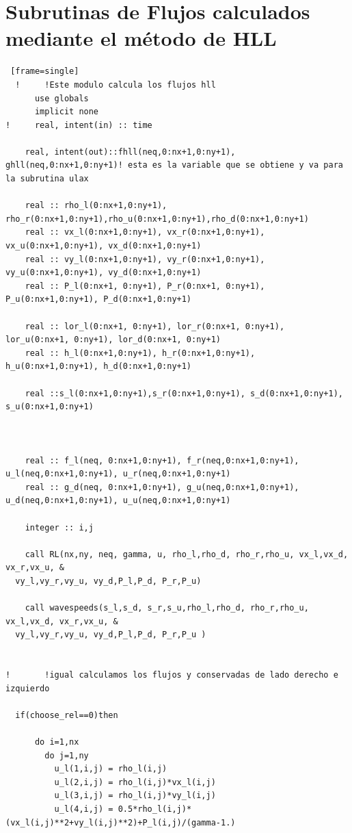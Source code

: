 \documentclass[12pt,a4paper]{book}
\begin{document}
\chapter{Subrutinas de Flujos calculados mediante el método de HLL}\label{ap_subrutina_fluxesHLL}

\begin{lstlisting} [frame=single]
  !     !Este modulo calcula los flujos hll
      use globals
      implicit none
!     real, intent(in) :: time
    
    real, intent(out)::fhll(neq,0:nx+1,0:ny+1), ghll(neq,0:nx+1,0:ny+1)! esta es la variable que se obtiene y va para la subrutina ulax

    real :: rho_l(0:nx+1,0:ny+1), rho_r(0:nx+1,0:ny+1),rho_u(0:nx+1,0:ny+1),rho_d(0:nx+1,0:ny+1)
    real :: vx_l(0:nx+1,0:ny+1), vx_r(0:nx+1,0:ny+1), vx_u(0:nx+1,0:ny+1), vx_d(0:nx+1,0:ny+1)
    real :: vy_l(0:nx+1,0:ny+1), vy_r(0:nx+1,0:ny+1), vy_u(0:nx+1,0:ny+1), vy_d(0:nx+1,0:ny+1)
    real :: P_l(0:nx+1, 0:ny+1), P_r(0:nx+1, 0:ny+1), P_u(0:nx+1,0:ny+1), P_d(0:nx+1,0:ny+1)

    real :: lor_l(0:nx+1, 0:ny+1), lor_r(0:nx+1, 0:ny+1), lor_u(0:nx+1, 0:ny+1), lor_d(0:nx+1, 0:ny+1)
    real :: h_l(0:nx+1,0:ny+1), h_r(0:nx+1,0:ny+1), h_u(0:nx+1,0:ny+1), h_d(0:nx+1,0:ny+1)

    real ::s_l(0:nx+1,0:ny+1),s_r(0:nx+1,0:ny+1), s_d(0:nx+1,0:ny+1), s_u(0:nx+1,0:ny+1)
    
    

    real :: f_l(neq, 0:nx+1,0:ny+1), f_r(neq,0:nx+1,0:ny+1), u_l(neq,0:nx+1,0:ny+1), u_r(neq,0:nx+1,0:ny+1)
    real :: g_d(neq, 0:nx+1,0:ny+1), g_u(neq,0:nx+1,0:ny+1), u_d(neq,0:nx+1,0:ny+1), u_u(neq,0:nx+1,0:ny+1)

    integer :: i,j

    call RL(nx,ny, neq, gamma, u, rho_l,rho_d, rho_r,rho_u, vx_l,vx_d, vx_r,vx_u, &
  vy_l,vy_r,vy_u, vy_d,P_l,P_d, P_r,P_u)

    call wavespeeds(s_l,s_d, s_r,s_u,rho_l,rho_d, rho_r,rho_u, vx_l,vx_d, vx_r,vx_u, &
  vy_l,vy_r,vy_u, vy_d,P_l,P_d, P_r,P_u )

    
!       !igual calculamos los flujos y conservadas de lado derecho e izquierdo

  if(choose_rel==0)then
  
      do i=1,nx
        do j=1,ny
          u_l(1,i,j) = rho_l(i,j)
          u_l(2,i,j) = rho_l(i,j)*vx_l(i,j)
          u_l(3,i,j) = rho_l(i,j)*vy_l(i,j)
          u_l(4,i,j) = 0.5*rho_l(i,j)*(vx_l(i,j)**2+vy_l(i,j)**2)+P_l(i,j)/(gamma-1.)


\end{lstlisting}
\end{document}
